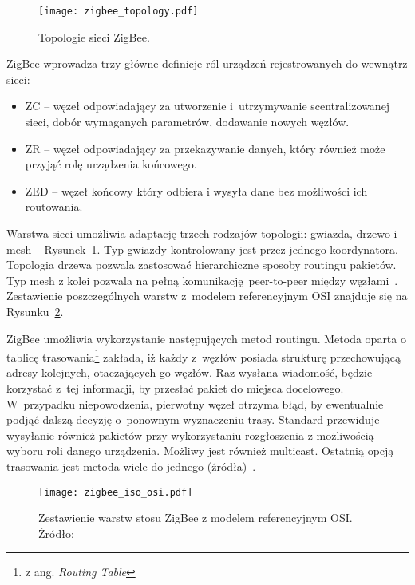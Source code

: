 \begin{figure}[!ht]
	\centering \texttt{[image: zigbee\_topology.pdf]}
	\caption{Topologie sieci ZigBee.}
	\label{rys:zigbee_topologies_an5506}
\end{figure}

ZigBee wprowadza trzy główne definicje ról urządzeń rejestrowanych do wewnątrz sieci:
\begin{itemize}
\item \gls{ZC} -- węzeł odpowiadający za utworzenie i~utrzymywanie scentralizowanej sieci, dobór wymaganych parametrów, dodawanie nowych węzłów.
\item \gls{ZR} -- węzeł odpowiadający za przekazywanie danych, który również może przyjąć rolę urządzenia końcowego. 
\item \gls{ZED} -- węzeł końcowy który odbiera i wysyła dane bez możliwości ich routowania.
\end{itemize}

Warstwa sieci umożliwia adaptację trzech rodzajów topologii: gwiazda, drzewo i mesh -- Rysunek~\ref{rys:zigbee_topologies_an5506}.
Typ gwiazdy kontrolowany jest przez jednego koordynatora. Topologia drzewa pozwala zastosować hierarchiczne
sposoby routingu pakietów. Typ mesh z kolei pozwala na pełną komunikację peer-to-peer między węzłami~\cite{zigbee_alliance_zigbee_2017}.
Zestawienie poszczególnych warstw z~modelem referencyjnym OSI znajduje się na Rysunku~\ref{rys:zigbee_osi_comparison_an5506}.

ZigBee umożliwia wykorzystanie następujących metod routingu. Metoda oparta o tablicę trasowania\footnote{z ang. \textit{Routing Table}}
zakłada, iż każdy z~węzłów posiada strukturę przechowującą adresy kolejnych, otaczających go węzłów. Raz wysłana wiadomość,
będzie korzystać z~tej informacji, by przesłać pakiet do miejsca docelowego. W~przypadku niepowodzenia, pierwotny węzeł otrzyma
błąd, by ewentualnie podjąć dalszą decyzję o~ponownym wyznaczeniu trasy. Standard przewiduje wysyłanie również pakietów
przy wykorzystaniu rozgłoszenia z możliwością wyboru roli danego urządzenia. Możliwy jest również multicast. Ostatnią
opcją trasowania jest metoda wiele-do-jednego (źródła)~\cite{silicon_laboratories_ug10302_2021}.

\begin{figure}[!ht]
	\centering \texttt{[image: zigbee\_iso\_osi.pdf]}
	\caption{Zestawienie warstw stosu ZigBee z modelem referencyjnym OSI. Źródło:~\cite{stmicroelectronics_an5506_2020}}
	\label{rys:zigbee_osi_comparison_an5506}
\end{figure}

